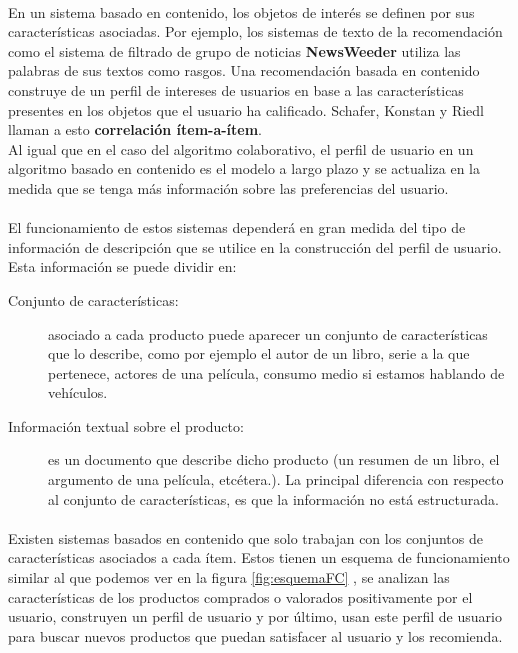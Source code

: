 \documentclass[12pt,letterpaper,oneside] {memoir}
\begin{document}
\paragraph{}
En un sistema basado en contenido, los objetos de interés se definen por sus características asociadas. Por ejemplo, los sistemas de texto de la recomendación como el sistema de filtrado de grupo de noticias \textbf{NewsWeeder} utiliza las palabras de sus textos como rasgos. Una recomendación basada en contenido construye de un perfil de intereses de usuarios en base a las características presentes en los objetos que el usuario ha calificado. Schafer, Konstan y Riedl llaman a esto \textbf{correlación ítem-a-ítem}. \\
Al igual que en el caso del algoritmo colaborativo, el perfil de usuario en un algoritmo basado en contenido es el modelo a largo plazo y se actualiza en la medida que se tenga más información sobre las preferencias del usuario.
\paragraph{}
El funcionamiento de estos sistemas dependerá en gran medida del tipo de información de descripción que se utilice en la construcción del perfil de usuario. Esta información se puede dividir en:
\begin{description}
\item [Conjunto de características:] asociado a cada producto puede aparecer un conjunto de características que lo describe, como por ejemplo el autor de un libro, serie a la que pertenece, actores de una película, consumo medio si estamos hablando de vehículos. 
\item [Información textual sobre el producto:] es un documento que describe dicho producto (un resumen de un libro, el argumento de una película, etcétera.). La principal diferencia con respecto al conjunto de características, es que la información no está estructurada.
\end{description}

\paragraph{}
Existen sistemas basados en contenido que solo trabajan con los conjuntos de características asociados a cada ítem.  Estos tienen un esquema de  funcionamiento similar al que podemos ver en la figura \ref{fig:esquemaFC} \citep{PerezCordon2008}, se analizan las características de los productos comprados o valorados positivamente por el usuario, construyen un perfil de usuario y por último, usan este perfil de usuario para buscar nuevos productos que puedan satisfacer al usuario y los recomienda.\\
\end{document}
